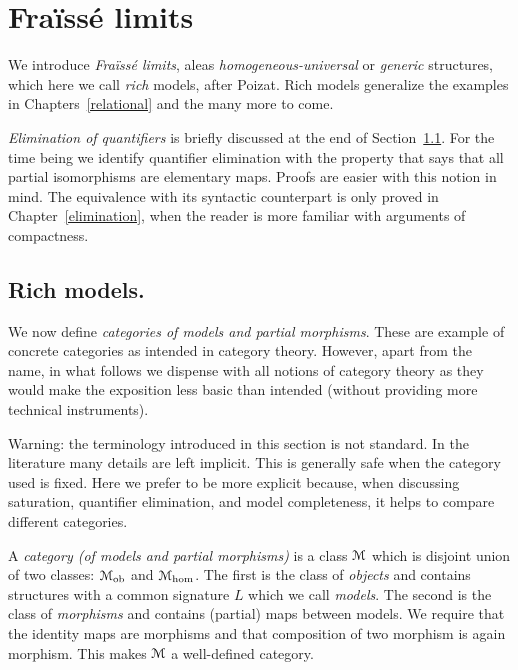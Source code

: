 \documentclass[creche.tex]{subfiles}
\begin{document}
\chapter{Fra\"issé limits}
\label{fraisse} 

\def\ceq#1#2#3{\parbox[b]{20ex}{$\displaystyle #1$}\parbox[b]{4ex}{\hfil$#2$}$\displaystyle #3$}

We introduce \textit{Fra\"iss\'e limits}, aleas \textit{homogeneous-universal\/} or \textit{generic\/} structures, which here we call \textit{rich\/} models, after Poizat.
Rich models generalize the examples in Chapters~\ref{relational} and the many more to come.

\textit{Elimination of quantifiers} is briefly discussed at the end of Section~\ref{rich}.
For the time being we identify  quantifier elimination with the property that says that all partial isomorphisms are elementary maps.
Proofs are easier with this notion in mind.
The equivalence with its syntactic counterpart is only proved in Chapter~\ref{elimination}, when the reader is more familiar with arguments of compactness.

\section{Rich models.}\label{rich}
We now define \textit{categories of models and partial morphisms}.
These are example of concrete categories as intended in category theory.
However, apart from the name, in what follows we dispense with all notions of category theory as they would make the exposition less basic than intended (without providing more technical instruments).

\noindent\llap{\textcolor{red}{\Large\danger}\kern1.5ex}Warning: the terminology introduced in this section is not standard.
In the literature many details are left implicit.
This is generally safe when the category used is fixed.
Here we prefer to be more explicit because, when discussing saturation, quantifier elimination, and model completeness, it helps to compare different categories.

A \emph{category (of models and partial morphisms)\/} is a class $\EuScript M$ which is disjoint union of two classes: \emph{$\EuScript M_{\textrm{ob}}$} and \emph{$\EuScript M_{\textrm{hom}}$}.
The first is the class of \emph{objects\/} and contains structures with a common signature $L$ which we call \emph{models}.
The second is the class of \emph{morphisms\/} and contains (partial) maps between models.
We require that the identity maps are morphisms and that composition of two morphism is again morphism.
This makes $\EuScript M$ a well-defined category.
\end{document}

